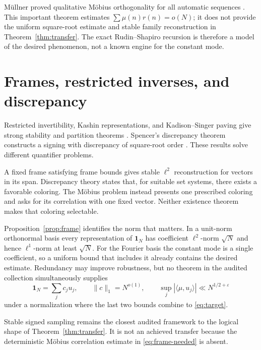 \documentclass[11pt]{amsart}
\numberwithin{equation}{section}
\theoremstyle{plain}
\theoremstyle{definition}
\theoremstyle{remark}
\newcommand{\one}{\mathbf 1}
\newcommand{\eps}{\varepsilon}
\begin{document}
M\"ullner proved qualitative M\"obius orthogonality for all automatic
sequences \cite{Muellner2017}.  This important theorem estimates
\(\sum\mu(n)r(n)=o(N)\); it does not provide the uniform square-root estimate
and stable family reconstruction in Theorem~\ref{thm:transfer}.  The exact
Rudin--Shapiro recursion is therefore a model of the desired phenomenon, not a
known engine for the constant mode.

\section{Frames, restricted inverses, and discrepancy}\label{sec:frames}

Restricted invertibility, Kashin representations, and Kadison--Singer paving
give strong stability and partition theorems
\cite{LyubarskiiVershynin2010,NaorYoussef2017,MSS2015}.  Spencer's discrepancy
theorem constructs a signing with discrepancy of square-root order
\cite{Spencer1985}.  These results solve different quantifier problems.

A fixed frame satisfying frame bounds gives stable \(\ell^2\)
reconstruction for vectors in its span.  Discrepancy theory states that, for
suitable set systems, there exists a favorable coloring.  The M\"obius problem
instead presents one prescribed coloring and asks for its correlation with one
fixed vector.  Neither existence theorem makes that coloring selectable.

Proposition~\ref{prop:frame} identifies the norm that matters.  In a unit-norm
orthonormal basis every representation of \(\one_N\) has coefficient
\(\ell^2\)-norm \(\sqrt N\) and hence \(\ell^1\)-norm at least \(\sqrt N\).
For the Fourier basis the constant mode is a single coefficient, so a uniform
bound that includes it already contains the desired estimate.  Redundancy may
improve robustness, but no theorem in the audited collection simultaneously
supplies
\begin{equation}\label{eq:frame-needed}
  \one_N=\sum_jc_ju_j,\qquad
  \|c\|_1=N^{o(1)},\qquad
  \sup_j|\langle\mu,u_j\rangle|\ll N^{1/2+\eps}
\end{equation}
under a normalization where the last two bounds combine to
\eqref{eq:target}.

Stable signed sampling remains the closest audited framework to the logical
shape of Theorem~\ref{thm:transfer}.  It is not an achieved transfer because
the deterministic M\"obius correlation estimate in \eqref{eq:frame-needed} is
absent.
\end{document}
